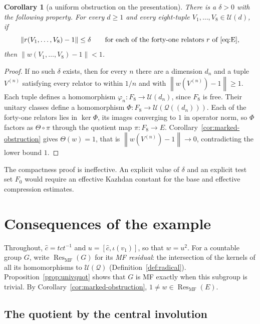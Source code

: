 \documentclass[11pt]{amsart}
\newcommand{\leanverified}[2]{\ignorespaces}
\newtheorem{corollary}[theorem]{Corollary}
\theoremstyle{definition}
\theoremstyle{remark}
\theoremstyle{plain}
\newcommand{\U}{\mathcal U}
\newcommand{\opnorm}[1]{\left\lVert #1\right\rVert}
\begin{document}
\begin{corollary}[a uniform obstruction on the presentation]
\label{cor:relator-uniform}
There is a $\delta>0$ with the following property.  For every $d\ge1$
and every eight-tuple $V_1,\dots,V_8\in\U(d)$, if
\[
 \opnorm{r(V_1,\dots,V_8)-1}\le\delta
 \qquad\text{for each of the forty-one relators $r$ of \eqref{eq:E},}
\]
then $\opnorm{w(V_1,\dots,V_8)-1}<1$.
\leanverified{Sofic/LiteralRelatorObstruction}{GroupApproximation.LiteralRelatorObstruction.literal_relator_uniform_obstruction}
\end{corollary}

\begin{proof}
If no such $\delta$ exists, then for every $n$ there are a dimension
$d_n$ and a tuple $V^{(n)}$ satisfying every relator to within $1/n$
and with $\opnorm{w(V^{(n)})-1}\ge1$.  Each tuple defines a
homomorphism $\varphi_n\colon F_8\to\U(d_n)$, since $F_8$ is free.  Their
unitary classes define a homomorphism
$\Phi\colon F_8\to\U(\mathcal Q((d_n)))$.  Each of the forty-one
relators lies in $\ker\Phi$, its images converging to $1$ in operator
norm, so $\Phi$ factors as $\Theta\circ\pi$ through the quotient map
$\pi\colon F_8\to E$.  Corollary~\ref{cor:marked-obstruction} gives $\Theta(w)=1$, that
is $\opnorm{w(V^{(n)})-1}\to0$, contradicting the lower bound $1$.
\end{proof}

The compactness proof is ineffective.  An explicit value of $\delta$ and an
explicit test set $F_0$ would require an effective Kazhdan constant for the
base and effective compression estimates.


\section{Consequences of the example}\label{sec:position}

Throughout, $\hat c=tct^{-1}$ and $u=[\hat c,\iota(v_1)]$, so that $w=u^2$.
For a countable group $G$, write $\operatorname{Res}_{\mathrm{MF}}(G)$
for its \emph{MF residual}: the intersection of the kernels of all its
homomorphisms to $\U(\mathcal Q)$ (Definition~\ref{def:radical}).
Proposition~\ref{prop:univquot} shows that $G$ is MF exactly when this
subgroup is trivial.  By Corollary~\ref{cor:marked-obstruction},
$1\ne w\in\operatorname{Res}_{\mathrm{MF}}(E)$.

\subsection*{The quotient by the central involution}
\end{document}
